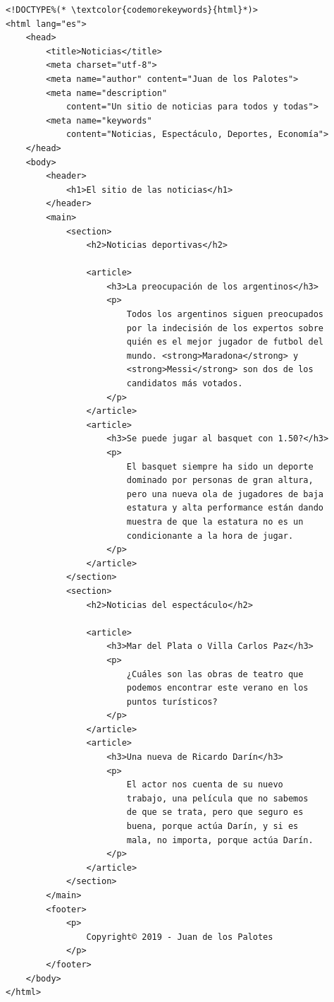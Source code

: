 \begin{lstlisting}[language=XHTML]
<!DOCTYPE%(* \textcolor{codemorekeywords}{html}*)>
<html lang="es">
    <head>
        <title>Noticias</title>
        <meta charset="utf-8">
        <meta name="author" content="Juan de los Palotes">
        <meta name="description"
            content="Un sitio de noticias para todos y todas">
        <meta name="keywords"
            content="Noticias, Espectáculo, Deportes, Economía">
    </head>
    <body>
        <header>
            <h1>El sitio de las noticias</h1>
        </header>
        <main>
            <section>
                <h2>Noticias deportivas</h2>

                <article>
                    <h3>La preocupación de los argentinos</h3>
                    <p>
                        Todos los argentinos siguen preocupados
                        por la indecisión de los expertos sobre
                        quién es el mejor jugador de futbol del
                        mundo. <strong>Maradona</strong> y
                        <strong>Messi</strong> son dos de los
                        candidatos más votados.
                    </p>
                </article>
                <article>
                    <h3>Se puede jugar al basquet con 1.50?</h3>
                    <p>
                        El basquet siempre ha sido un deporte
                        dominado por personas de gran altura,
                        pero una nueva ola de jugadores de baja
                        estatura y alta performance están dando
                        muestra de que la estatura no es un
                        condicionante a la hora de jugar.
                    </p>
                </article>
            </section>
            <section>
                <h2>Noticias del espectáculo</h2>

                <article>
                    <h3>Mar del Plata o Villa Carlos Paz</h3>
                    <p>
                        ¿Cuáles son las obras de teatro que
                        podemos encontrar este verano en los
                        puntos turísticos?
                    </p>
                </article>
                <article>
                    <h3>Una nueva de Ricardo Darín</h3>
                    <p>
                        El actor nos cuenta de su nuevo
                        trabajo, una película que no sabemos
                        de que se trata, pero que seguro es
                        buena, porque actúa Darín, y si es
                        mala, no importa, porque actúa Darín.
                    </p>
                </article>
            </section>
        </main>
        <footer>
            <p>
                Copyright© 2019 - Juan de los Palotes
            </p>
        </footer>
    </body>
</html>
\end{lstlisting}

